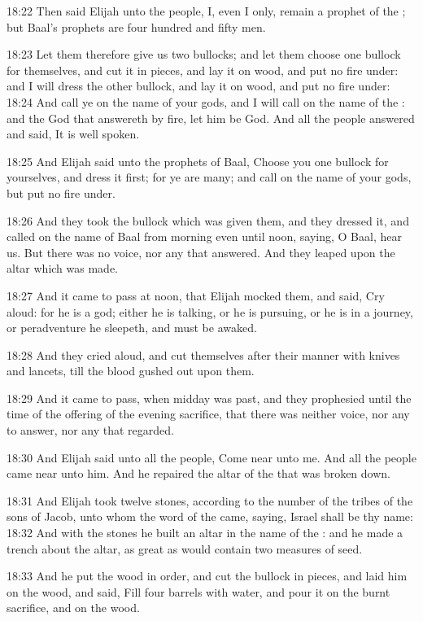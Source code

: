 18:22 Then said Elijah unto the people, I, even I only, remain a prophet of the \LORD; but Baal's prophets are four hundred and fifty men.

18:23 Let them therefore give us two bullocks; and let them choose one bullock for themselves, and cut it in pieces, and lay it on wood, and put no fire under: and I will dress the other bullock, and lay it on wood, and put no fire under: 18:24 And call ye on the name of your gods, and I will call on the name of the \LORD: and the God that answereth by fire, let him be God. And all the people answered and said, It is well spoken.

18:25 And Elijah said unto the prophets of Baal, Choose you one bullock for yourselves, and dress it first; for ye are many; and call on the name of your gods, but put no fire under.

18:26 And they took the bullock which was given them, and they dressed it, and called on the name of Baal from morning even until noon, saying, O Baal, hear us. But there was no voice, nor any that answered. And they leaped upon the altar which was made.

18:27 And it came to pass at noon, that Elijah mocked them, and said, Cry aloud: for he is a god; either he is talking, or he is pursuing, or he is in a journey, or peradventure he sleepeth, and must be awaked.

18:28 And they cried aloud, and cut themselves after their manner with knives and lancets, till the blood gushed out upon them.

18:29 And it came to pass, when midday was past, and they prophesied until the time of the offering of the evening sacrifice, that there was neither voice, nor any to answer, nor any that regarded.

18:30 And Elijah said unto all the people, Come near unto me. And all the people came near unto him. And he repaired the altar of the \LORD that was broken down.

18:31 And Elijah took twelve stones, according to the number of the tribes of the sons of Jacob, unto whom the word of the \LORD came, saying, Israel shall be thy name: 18:32 And with the stones he built an altar in the name of the \LORD: and he made a trench about the altar, as great as would contain two measures of seed.

18:33 And he put the wood in order, and cut the bullock in pieces, and laid him on the wood, and said, Fill four barrels with water, and pour it on the burnt sacrifice, and on the wood.

